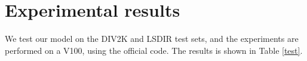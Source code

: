 \documentclass[10pt,twocolumn,letterpaper]{article}
\begin{document}
\section{Experimental results}
We test our model on the DIV2K and LSDIR test sets, and the experiments are performed on a V100, using the official code. The results is shown in Table \ref{test}.
\begin{table}[h]
	\centering
	\caption{ Result of DIV2K and LSDIR test sets}
	\label{test}
	
\end{table}







{\small
	
	
}
\end{document}
